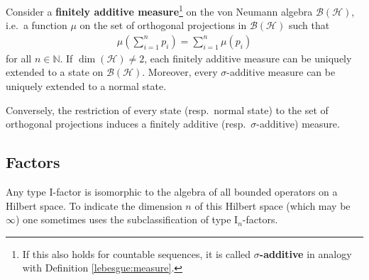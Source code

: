 

    \begin{theorem}[Gleason]
        Consider a \textbf{finitely additive measure}\footnote{If this also holds for countable sequences, it is called \textbf{$\sigma$-additive} in analogy with Definition \ref{lebesgue:measure}.} on the von Neumann algebra $\mathcal{B}(\mathcal{H})$, i.e.~a function $\mu$ on the set of orthogonal projections in $\mathcal{B}(\mathcal{H})$ such that
        \begin{gather}
            \mu\left(\sum_{i=1}^np_i\right) = \sum_{i=1}^n\mu(p_i)
        \end{gather}
        for all $n\in\mathbb{N}$. If $\dim(\mathcal{H})\neq2$, each finitely additive measure can be uniquely extended to a state on $\mathcal{B}(\mathcal{H})$. Moreover, every $\sigma$-additive measure can be uniquely extended to a normal state.

        Conversely, the restriction of every state (resp.~normal state) to the set of orthogonal projections induces a finitely additive (resp.~$\sigma$-additive) measure.
    \end{theorem}

\subsection{Factors}


    \begin{property}
        Any type $\mathrm{I}$-factor is isomorphic to the algebra of all bounded operators on a Hilbert space. To indicate the dimension $n$ of this Hilbert space (which may be $\infty$) one sometimes uses the subclassification of type $\mathrm{I}_n$-factors.
    \end{property}


